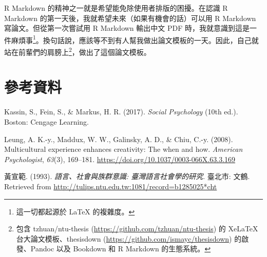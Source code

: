 \documentclass[oneside]{book}
\let\oldhref=\href
\renewcommand{\href}[2]{#2\footnote{\url{#1}}}
\theoremstyle{definition}
\theoremstyle{definition}
\theoremstyle{definition}
\theoremstyle{remark}
\begin{document}
R Markdown 的精神之一就是希望能免除使用者排版的困擾。在認識 R Markdown
的第一天後，我就希望未來（如果有機會的話）可以用 R Markdown
寫論文。但從第一次嘗試用 R Markdown 輸出中文 PDF
時，我就意識到這是一件麻煩事\footnote{這一切都起源於 LaTeX 的複雜度。}。換句話說，應該等不到有人幫我做出論文模板的一天。因此，自己就站在前輩們的肩膀上\footnote{包含
  tzhuan/ntu-thesis (\url{https://github.com/tzhuan/ntu-thesis}) 的
  XeLaTeX 台大論文模板、thesisdown
  (\url{https://github.com/ismayc/thesisdown}) 的啟發、Pandoc 以及
  Bookdown 和 R Markdown 的生態系統。}，做出了這個論文模板。

\renewcommand{\href}{\oldhref}

\chapter*{參考資料}\label{references}

\hypertarget{refs}{}
\hypertarget{ref-kassin2017}{}
Kassin, S., Fein, S., \& Markus, H. R. (2017). \emph{Social Psychology}
(10th ed.). Boston: Cengage Learning.

\hypertarget{ref-leung2008}{}
Leung, A. K.-y., Maddux, W. W., Galinsky, A. D., \& Chiu, C.-y. (2008).
Multicultural experience enhances creativity: The when and how.
\emph{American Psychologist}, \emph{63}(3), 169--181.
\url{https://doi.org/10.1037/0003-066X.63.3.169}

\hypertarget{ref-huangxuanfan1993}{}
黃宣範. (1993). \emph{語言、社會與族群意識: 臺灣語言社會學的研究}.
臺北市: 文鶴. Retrieved from
\url{http://tulips.ntu.edu.tw:1081/record=b1285025*cht}
\end{document}
